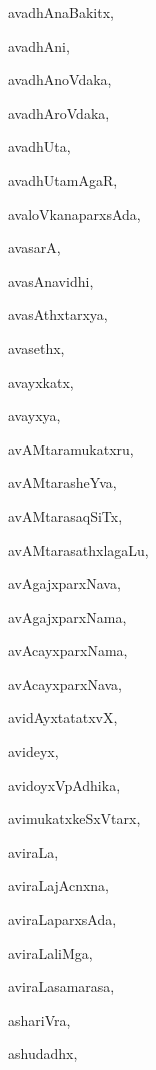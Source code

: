 \begin{multicols}{2}
{avadhAnaBakitx}, \pageref{avadhAnaBakitx}

{avadhAni}, \pageref{avadhAni}

{avadhAnoVdaka}, \pageref{avadhAnoVdaka}

{avadhAroVdaka}, \pageref{avadhAroVdaka}

{avadhUta}, \pageref{avadhUta}

{avadhUtamAgaR}, \pageref{avadhUtamAgaR}

{avaloVkanaparxsAda}, \pageref{avaloVkanaparxsAda}

{avasarA}, \pageref{avasarA}

{avasAnavidhi}, \pageref{avasAnavidhi}

{avasAthxtarxya}, \pageref{avasAthxtarxya}

{avasethx}, \pageref{avasethx}

{avayxkatx}, \pageref{avayxkatx}

{avayxya}, \pageref{avayxya}

{avAMtaramukatxru}, \pageref{avAMtaramukatxru}

{avAMtarasheYva}, \pageref{avAMtarasheYva}

{avAMtarasaqSiTx}, \pageref{avAMtarasaqSiTx}

{avAMtarasathxlagaLu}, \pageref{avAMtarasathxlagaLu}

{avAgajxparxNava}, \pageref{avAgajxparxNava}

{avAgajxparxNama}, \pageref{avAgajxparxNama}

{avAcayxparxNama}, \pageref{avAcayxparxNama}

{avAcayxparxNava}, \pageref{avAcayxparxNava}

{avidAyxtatatxvX}, \pageref{avidAyxtatatxvX}

{avideyx}, \pageref{avideyx}

{avidoyxVpAdhika}, \pageref{avidoyxVpAdhika}

{avimukatxkeSxVtarx}, \pageref{avimukatxkeSxVtarx}

{aviraLa}, \pageref{aviraLa}

{aviraLajAcnxna}, \pageref{aviraLajAcnxna}

{aviraLaparxsAda}, \pageref{aviraLaparxsAda}

{aviraLaliMga}, \pageref{aviraLaliMga}

{aviraLasamarasa}, \pageref{aviraLasamarasa}

{ashariVra}, \pageref{ashariVra}

{ashudadhx}, \pageref{ashudadhx}


\end{multicols}
